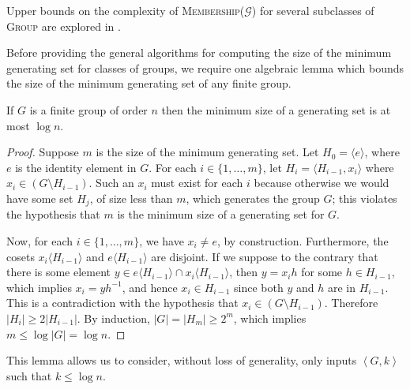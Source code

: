\documentclass{article}
\newcommand{\gen}[1]{{\langle #1 \rangle}}
\newcommand{\pair}[2]{\left\langle #1, #2 \right\rangle}
\begin{document}
Upper bounds on the complexity of \textsc{Membership($\mathcal{G}$)} for several subclasses of \textsc{Group} are explored in \cite{bklm01}.

Before providing the general algorithms for computing the size of the minimum generating set for classes of groups, we require one algebraic lemma which bounds the size of the minimum generating set of any finite group.

\begin{lemma}\label{lem:log}
  If $G$ is a finite group of order $n$ then the minimum size of a generating set is at most $\log n$.
\end{lemma}
\begin{proof}
  Suppose $m$ is the size of the minimum generating set.
  Let $H_0 = \gen{e}$, where $e$ is the identity element in $G$.
  For each $i \in \{1, \dotsc, m\}$, let $H_i = \gen{H_{i - 1}, x_i}$ where $x_i \in (G \setminus H_{i - 1})$.
  Such an $x_i$ must exist for each $i$ because otherwise we would have some set $H_j$, of size less than $m$, which generates the group $G$; this violates the hypothesis that $m$ is the minimum size of a generating set for $G$.

  Now, for each $i \in \{1, \dotsc, m\}$, we have $x_i \neq e$, by construction.
  Furthermore, the cosets $x_i \gen{H_{i - 1}}$ and $e \gen{H_{i - 1}}$ are disjoint.
  If we suppose to the contrary that there is some element $y \in e \gen{H_{i - 1}} \cap x_i \gen{H_{i - 1}}$, then $y = x_i h$ for some $h \in H_{i - 1}$, which implies $x_i = yh^{-1}$, and hence $x_i \in H_{i - 1}$ since both $y$ and $h$ are in $H_{i - 1}$.
  This is a contradiction with the hypothesis that $x_i \in (G \setminus H_{i - 1})$.
  Therefore $|H_i| \geq 2 |H_{i - 1}|$.
  By induction, $|G| = |H_m| \geq 2^m$, which implies $m \leq \log |G| = \log n$.
\end{proof}

This lemma allows us to consider, without loss of generality, only inputs $\pair{G}{k}$ such that $k \leq \log n$.
\end{document}
